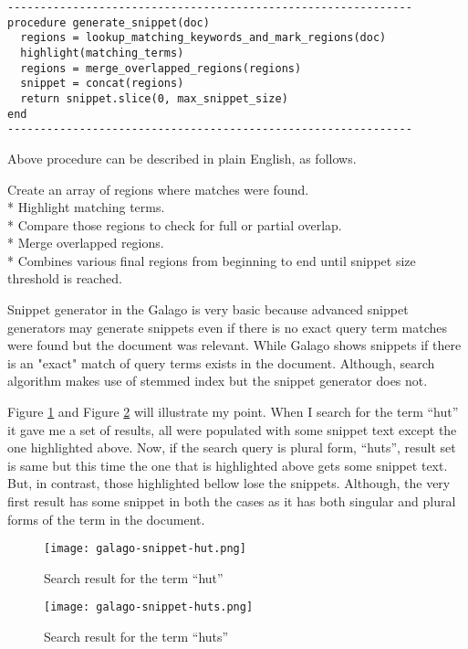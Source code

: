 \documentclass[letterpaper,12pt]{article}
\begin{document}
\begin{verbatim}
--------------------------------------------------------------
procedure generate_snippet(doc)
  regions = lookup_matching_keywords_and_mark_regions(doc)
  highlight(matching_terms)
  regions = merge_overlapped_regions(regions)
  snippet = concat(regions)
  return snippet.slice(0, max_snippet_size)
end
--------------------------------------------------------------
\end{verbatim}

Above procedure can be described in plain English, as follows.

Create an array of regions where matches were found.\\*
Highlight matching terms.\\*
Compare those regions to check for full or partial overlap.\\*
Merge overlapped regions.\\*
Combines various final regions from beginning to end until snippet size threshold is reached.

Snippet generator in the Galago is very basic because advanced snippet generators may generate snippets even if there is no exact query term matches were found but the document was relevant. While Galago shows snippets if there is an "exact" match of query terms exists in the document. Although, search algorithm makes use of stemmed index but the snippet generator does not.

Figure \ref{ghut} and Figure \ref{ghuts} will illustrate my point. When I search for the term ``hut'' it gave me a set of results, all were populated with some snippet text except the one highlighted above. Now, if the search query is plural form, ``huts'', result set is same but this time the one that is highlighted above gets some snippet text. But, in contrast, those highlighted bellow lose the snippets. Although, the very first result has some snippet in both the cases as it has both singular and plural forms of the term in the document.

\begin{figure}[htp]
\centering
\texttt{[image: galago-snippet-hut.png]}
\caption{Search result for the term ``hut''}
\label{ghut}
\end{figure}

\begin{figure}[htp]
\centering
\texttt{[image: galago-snippet-huts.png]}
\caption{Search result for the term ``huts''}
\label{ghuts}
\end{figure}
\end{document}
